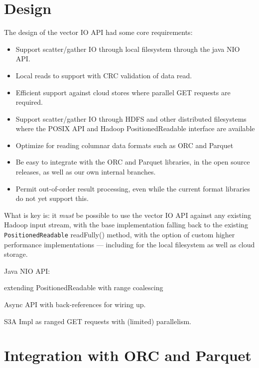 \documentclass[conference]{IEEEtran}
\begin{document}

\section{Design}
\label{sec:design}

The design of the vector IO API had some core requirements:
\begin{itemize}
  \item Support scatter/gather IO through local filesystem through the java NIO API.
  \item Local reads to support with CRC validation of data read.
  \item Efficient support against cloud stores where parallel GET requests are required.
  \item Support scatter/gather IO through HDFS and other distributed filesystems
        where the POSIX API and Hadoop PositionedReadable interface are available
  \item Optimize for reading columnar data formats such as ORC and Parquet
  \item Be easy to integrate with the ORC and Parquet libraries, in the open
        source releases, as well as our own internal branches.
  \item Permit out-of-order result processing, even while the current format libraries
        do not yet support this.
\end{itemize}

What is key is: it \emph{must} be possible to use the vector IO API against
any existing Hadoop input stream, with the base implementation
falling back to the existing \texttt{PositionedReadable} readFully() method,
with the option of custom higher performance implementations --- including
for the local filesystem as well as cloud storage.

Java NIO API:

extending PositionedReadable with range coalescing

Async API with back-references for wiring up.

S3A Impl as ranged GET requests with (limited) parallelism.


\section{Integration with ORC and Parquet}
\label{sec:integration}
\end{document}
